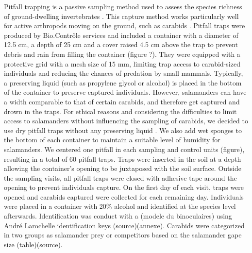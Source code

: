 Pitfall trapping is a passive sampling method used to assess the species richness of ground-dwelling invertebrates \citep{knappEffectPitfallTrap2012,kotzeFortyYearsCarabid2011a,loveiEcologyBehaviorGround1996}.
This capture method works particularly well for active arthropods moving on the ground, such as carabids \citep{baarsCatchesPitfallTraps1979,loveiEcologyBehaviorGround1996}. 
Pitfall traps were produced by Bio.Contrôle services and included a container with a diameter of 12.5 cm, a depth of 25 cm and a cover raised 4.5 cm above the trap 
to prevent debris and rain from filling the container (figure ?).
They were equipped with a protective grid with a mesh size of 15 mm, limiting trap access to carabid-sized individuals and reducing the chances of predation by small mammals. 
Typically, a preserving liquid (such as propylene glycol or alcohol) is placed in the bottom of the container to preserve captured individuals. 
However, salamanders can have a width comparable to that of certain carabids, and therefore get captured and drown in the traps. 
For ethical reasons and considering the difficulties to limit access to salamanders without influencing the sampling of carabids, we decided to use dry pitfall traps without any preserving liquid \citep{luffFeaturesInfluencingEfficiency1975}. 
We also add wet sponges to the bottom of each container to maintain a suitable level of humidity for salamanders.
We centered one pitfall in each sampling and control units (figure), resulting in a total of 60 pitfall traps. 
Traps were inserted in the soil at a depth allowing the container's opening to be juxtaposed with the soil surface. 
Outside the sampling visits, all pitfall traps were closed with adhesive tape around the opening to prevent individuals capture. 
On the first day of each visit, traps were opened and carabids captured were collected for each remaining day. 
Individuals were placed in a container with 20\% alcohol and identified at the species level afterwards.
Identification was conduct with a (modele du binoculaires) using André Larochelle identification keys (source)(annexe).
Carabids were categorized in two groups as salamander prey or competitors based on the salamander gape size (table)(source).

